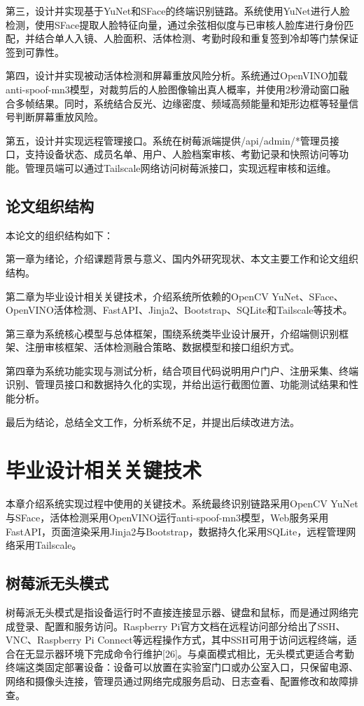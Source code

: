 \documentclass[UTF8]{heuthesis}
\begin{document}
第三，设计并实现基于YuNet和SFace的终端识别链路。系统使用YuNet进行人脸检测，使用SFace提取人脸特征向量，通过余弦相似度与已审核人脸库进行身份匹配，并结合单人入镜、人脸面积、活体检测、考勤时段和重复签到冷却等门禁保证签到可靠性。

第四，设计并实现被动活体检测和屏幕重放风险分析。系统通过OpenVINO加载anti-spoof-mn3模型，对裁剪后的人脸图像输出真人概率，并使用2秒滑动窗口融合多帧结果。同时，系统结合反光、边缘密度、频域高频能量和矩形边框等轻量信号判断屏幕重放风险。

第五，设计并实现远程管理接口。系统在树莓派端提供/api/admin/*管理员接口，支持设备状态、成员名单、用户、人脸档案审核、考勤记录和快照访问等功能。管理员端可以通过Tailscale网络访问树莓派接口，实现远程审核和运维。

\section{论文组织结构}
本论文的组织结构如下：

第一章为绪论，介绍课题背景与意义、国内外研究现状、本文主要工作和论文组织结构。

第二章为毕业设计相关关键技术，介绍系统所依赖的OpenCV YuNet、SFace、OpenVINO活体检测、FastAPI、Jinja2、Bootstrap、SQLite和Tailscale等技术。

第三章为系统核心模型与总体框架，围绕系统类毕业设计展开，介绍端侧识别框架、注册审核框架、活体检测融合策略、数据模型和接口组织方式。

第四章为系统功能实现与测试分析，结合项目代码说明用户门户、注册采集、终端识别、管理员接口和数据持久化的实现，并给出运行截图位置、功能测试结果和性能分析。

最后为结论，总结全文工作，分析系统不足，并提出后续改进方法。

\chapter{毕业设计相关关键技术}
本章介绍系统实现过程中使用的关键技术。系统最终识别链路采用OpenCV YuNet与SFace，活体检测采用OpenVINO运行anti-spoof-mn3模型，Web服务采用FastAPI，页面渲染采用Jinja2与Bootstrap，数据持久化采用SQLite，远程管理网络采用Tailscale。

\section{树莓派无头模式}
树莓派无头模式是指设备运行时不直接连接显示器、键盘和鼠标，而是通过网络完成登录、配置和服务访问。Raspberry Pi官方文档在远程访问部分给出了SSH、VNC、Raspberry Pi Connect等远程操作方式，其中SSH可用于访问远程终端，适合在无显示器环境下完成命令行维护[26]。与桌面模式相比，无头模式更适合考勤终端这类固定部署设备：设备可以放置在实验室门口或办公室入口，只保留电源、网络和摄像头连接，管理员通过网络完成服务启动、日志查看、配置修改和故障排查。
\end{document}
